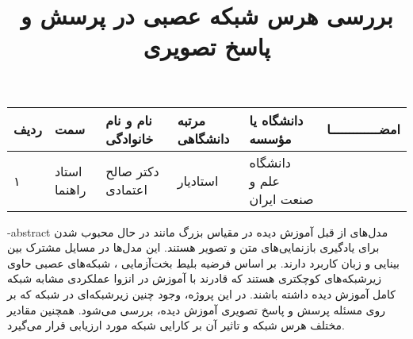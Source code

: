 



\subject{مهندسی کامپیوتر}


\title{بررسی هرس شبکه عصبی در پرسش و پاسخ تصویری}







\firstPage
\besmPage
\davaranPage

\vspace{.5cm}

\begin{center}
	\begin{tabular}{| p{8mm} | p{18mm} | p{} |p{14mm}|p{}|c|}
		\hline
		ردیف	& سمت & نام و نام خانوادگی & مرتبه \newline دانشگاهی &	دانشگاه یا مؤسسه &	امضـــــــــــــا\\
		\hline
		۱  &	استاد راهنما & دکتر \newline  صالح اعتمادی & استادیار & دانشگاه \newline علم و صنعت ایران &  \\
		\hline

	\end{tabular}
\end{center}


\fa-abstract{
مدل‌های از قبل آموزش دیده در مقیاس بزرگ مانند
در حال محبوب شدن برای یادگیری بازنمایی‌های متن و تصویر هستند. این مدل‌ها در مسايل مشترک بین بینایی و زبان کاربرد دارند. بر اساس فرضیه بلیط بخت‌آزمایی
،
 شبکه‌های عصبی حاوی زیرشبکه‌های 
 کوچکتری هستند که قادرند با آموزش در انزوا
  عملکردی مشابه شبکه کامل آموزش دیده داشته باشند. در این پروژه، وجود چنین زیرشبکه‌ای در شبکه
   که بر روی مسئله پرسش و پاسخ تصویری آموزش دیده، بررسی می‌شود. همچنین مقادیر مختلف هرس شبکه و تاثیر آن بر کارایی شبکه مورد ارزیابی قرار می‌گیرد.
}

\abstractPage

\newpage\clearpage

